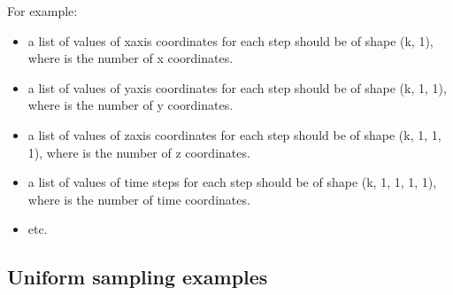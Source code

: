 \documentclass[letterpaper,10pt,english]{sphinxmanual}
\begin{document}
\sphinxAtStartPar
For example:
\begin{itemize}
\item {} 
\sphinxAtStartPar
a list of values of x\sphinxhyphen{}axis coordinates for each step should be of shape (k, 1), where  is the number of x coordinates.

\item {} 
\sphinxAtStartPar
a list of values of y\sphinxhyphen{}axis coordinates for each step should be of shape (k, 1, 1), where  is the number of y coordinates.

\item {} 
\sphinxAtStartPar
a list of values of z\sphinxhyphen{}axis coordinates for each step should be of shape (k, 1, 1, 1), where  is the number of z coordinates.

\item {} 
\sphinxAtStartPar
a list of values of time steps for each step should be of shape (k, 1, 1, 1, 1), where  is the number of time coordinates.

\item {} 
\sphinxAtStartPar
etc.

\end{itemize}


\subsection{Uniform sampling examples}
\label{\detokenize{source/normalization:uniform-sampling-examples}}
\end{document}
